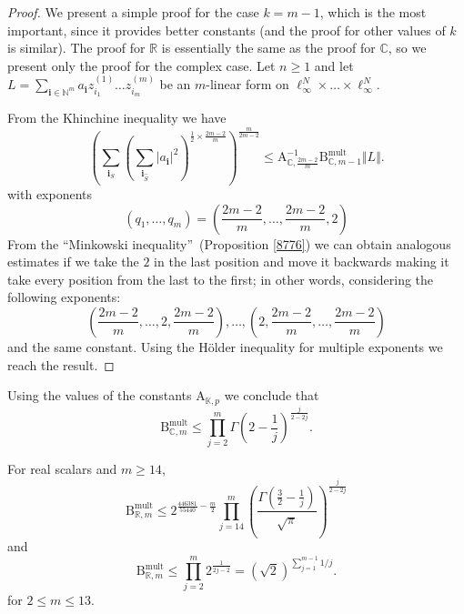 \documentclass[10pt]{amsart}
\numberwithin{equation}{section}
\begin{document}
\begin{proof}
We present a simple proof for the case $k=m-1$, which is the most important,
since it provides better constants (and the proof for other values of $k$ is
similar). The proof for $\mathbb{R}$ is essentially the same as the proof
for $\mathbb{C}$, so we present only the proof for the complex case. Let $n\geq 1$ and let $L=\sum_{\mathbf{i}\in \mathbb{N}^{m}}a_{\mathbf{i}}z_{i_{1}}^{(1)}\dots z_{i_{m}}^{(m)}$ be an $m$-linear form on $\ell
_{\infty }^{N}\times \dots \times \ell _{\infty }^{N}$.

From the Khinchine inequality we have
\begin{equation*}
\left( \sum_{\mathbf{i}_{S}}\left( \sum_{\mathbf{i}_{\hat{S}}}|a_{\mathbf{i}}|^{2}\right) ^{\frac{1}{2}\times \frac{2m-2}{m}}\right) ^{\frac{m}{2m-2}}\leq \mathrm{A}_{\mathbb{C},\frac{2m-2}{m}}^{-1}\mathrm{B}_{\mathbb{C},m-1}^{\mathrm{mult}}\Vert L\Vert .
\end{equation*}with exponents\begin{equation*}
\left( q_{1},\ldots,q_{m}\right) =\left( \frac{2m-2}{m},\ldots,\frac{2m-2}{m},2\right)
\end{equation*}From the \textquotedblleft Minkowski inequality\textquotedblright\
(Proposition \ref{8776}) we can obtain analogous estimates if we take the $2$
in the last position and move it backwards making it take every position
from the last to the first; in other words, considering the following
exponents:
\begin{equation*}
\left( \frac{2m-2}{m},\ldots,2,\frac{2m-2}{m}\right) ,\ldots,\left( 2,\frac{2m-2}{m},\ldots,\frac{2m-2}{m}\right)
\end{equation*}
and the same constant. Using the H\"{o}lder inequality for multiple
exponents we reach the result.
\end{proof}

Using the values of the constants $\mathrm{A}_{\mathbb{K},p}$ we conclude
that
\begin{equation}
\mathrm{B}_{\mathbb{C},m}^{\mathrm{mult}}\leq \prod\limits_{j=2}^{m}\Gamma
\left( 2-\frac{1}{j}\right)^{\frac{j}{2-2j}}.  \label{uyt}
\end{equation}

For real scalars and $m\geq14$,
\begin{equation}
\mathrm{B}_{\mathbb{R},m}^{\mathrm{mult}}\leq 2^{\frac{446381}{55440}-\frac{m}{2}}\prod\limits_{j=14}^{m}\left( \frac{\Gamma \left( \frac{3}{2}-\frac{1}{j}\right) }{\sqrt{\pi }}\right) ^{\frac{j}{2-2j}}  \label{uyt5}
\end{equation}
and
\begin{equation*}
\mathrm{B}^{\mathrm{mult}}_{\mathbb{R},m}\leq\prod \limits_{j=2}^{m}2^{\frac{1}{2j-2}}= \left(\sqrt{2}\right)^{\sum_{j=1}^{m-1} 1/j}.
\end{equation*}
for $2\leq m\leq13$.
\end{document}
